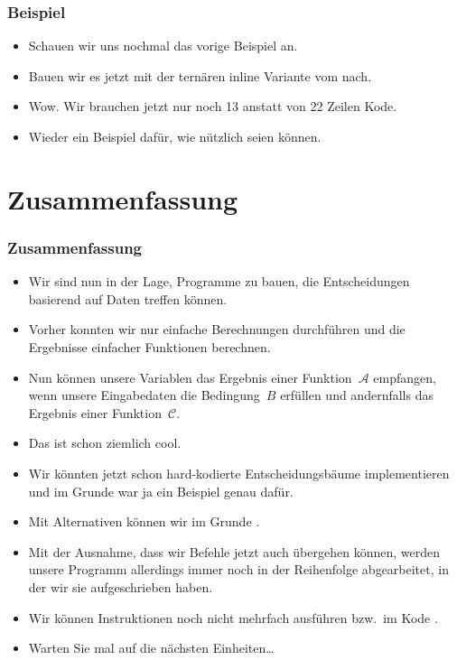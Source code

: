 \documentclass[aspectratio=169,mathserif,notheorems]{beamer}%
\begin{document}
\begin{frame}[t]%
\frametitle{Beispiel}%
%
\parbox{0.4\paperwidth}{\small{%
\begin{itemize}%
\item Schauen wir uns nochmal das vorige Beispiel an.%
\item<2-> Bauen wir es jetzt mit der ternären inline Variante vom  nach.%
\item<4-> Wow. Wir brauchen jetzt nur noch 13 anstatt von 22 Zeilen Kode.%
\item<5-> Wieder ein Beispiel dafür, wie nützlich  seien können.%
\end{itemize}%
}}%
%
%
%
%
%
\end{frame}%
%
\section{Zusammenfassung}%
%
\begin{frame}%
\frametitle{Zusammenfassung}%
\begin{itemize}%
\item Wir sind nun in der Lage, Programme zu bauen, die Entscheidungen basierend auf Daten treffen können.%
%
\item<2-> Vorher konnten wir nur einfache Berechnungen durchführen und die Ergebnisse einfacher Funktionen berechnen.%
%
\item<3-> Nun können unsere Variablen das Ergebnis einer Funktion~${\mathcal{A}}$ empfangen, wenn unsere Eingabedaten die Bedingung~$B$ erfüllen und andernfalls das Ergebnis einer Funktion~${\mathcal{C}}$.%
%
\item<4-> Das ist schon ziemlich cool.%
%
\item<5-> Wir könnten jetzt schon hard-kodierte Entscheidungsbäume implementieren und im Grunde war ja  ein Beispiel genau dafür.%
%
\item<6-> Mit Alternativen können wir im Grunde .%
%
\item<7-> Mit der Ausnahme, dass wir Befehle jetzt auch übergehen können, werden unsere Programm allerdings immer noch in der Reihenfolge abgearbeitet, in der wir sie aufgeschrieben haben.%
%
\item<8-> Wir können Instruktionen noch nicht mehrfach ausführen bzw.\ im Kode .%
%
\item<9-> Warten Sie mal auf die nächsten Einheiten\dots%
\end{itemize}%
%
\end{frame}%
%
\endPresentation%
\end{document}
